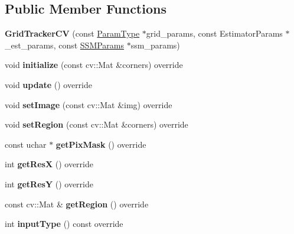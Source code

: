 \subsection*{Public Member Functions}
\begin{DoxyCompactItemize}
\item 
\hypertarget{classGridTrackerCV_a24a98276b105cef067cd6bac3965df3d}{{\bfseries Grid\-Tracker\-C\-V} (const \hyperlink{structGridTrackerCVParams}{Param\-Type} $\ast$grid\-\_\-params, const Estimator\-Params $\ast$\-\_\-est\-\_\-params, const \hyperlink{structSSMParams}{S\-S\-M\-Params} $\ast$ssm\-\_\-params)}\label{classGridTrackerCV_a24a98276b105cef067cd6bac3965df3d}

\item 
\hypertarget{classGridTrackerCV_acc0a38caa5292351e0e9fca6da78a67f}{void {\bfseries initialize} (const cv\-::\-Mat \&corners) override}\label{classGridTrackerCV_acc0a38caa5292351e0e9fca6da78a67f}

\item 
\hypertarget{classGridTrackerCV_a9b836b5f5ad8c708e1adac18cba51967}{void {\bfseries update} () override}\label{classGridTrackerCV_a9b836b5f5ad8c708e1adac18cba51967}

\item 
\hypertarget{classGridTrackerCV_ac1c38cfe408d17ea08f862872be01b38}{void {\bfseries set\-Image} (const cv\-::\-Mat \&img) override}\label{classGridTrackerCV_ac1c38cfe408d17ea08f862872be01b38}

\item 
\hypertarget{classGridTrackerCV_aef8f7321456ff761f9f71c24bebc13b1}{void {\bfseries set\-Region} (const cv\-::\-Mat \&corners) override}\label{classGridTrackerCV_aef8f7321456ff761f9f71c24bebc13b1}

\item 
\hypertarget{classGridTrackerCV_aecc4a18455b63bf7781e898e5398fd9a}{const uchar $\ast$ {\bfseries get\-Pix\-Mask} () override}\label{classGridTrackerCV_aecc4a18455b63bf7781e898e5398fd9a}

\item 
\hypertarget{classGridTrackerCV_ace18986527c37c645f3b7cbd169ece45}{int {\bfseries get\-Res\-X} () override}\label{classGridTrackerCV_ace18986527c37c645f3b7cbd169ece45}

\item 
\hypertarget{classGridTrackerCV_aac28caa2d87bc703691bf4ddc452cb00}{int {\bfseries get\-Res\-Y} () override}\label{classGridTrackerCV_aac28caa2d87bc703691bf4ddc452cb00}

\item 
\hypertarget{classGridTrackerCV_ac05e7cff4c180363f2761cbac3a35637}{const cv\-::\-Mat \& {\bfseries get\-Region} () override}\label{classGridTrackerCV_ac05e7cff4c180363f2761cbac3a35637}

\item 
\hypertarget{classGridTrackerCV_aad9e44ba4689e55edb85ccd17ceadd3c}{int {\bfseries input\-Type} () const override}\label{classGridTrackerCV_aad9e44ba4689e55edb85ccd17ceadd3c}

\end{DoxyCompactItemize}
